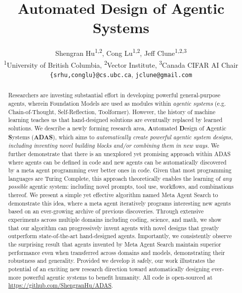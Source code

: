 \documentclass{article} %
\title{Automated Design of Agentic Systems}
\author{Shengran Hu\textsuperscript{1,2}, Cong Lu\textsuperscript{1,2}, Jeff Clune\textsuperscript{1,2,3} \vspace{0.1cm}\\
\textsuperscript{1}University of British Columbia,
\textsuperscript{2}Vector Institute,
\textsuperscript{3}Canada CIFAR AI Chair \vspace{0.1cm} \\
\texttt{\{srhu,conglu\}@cs.ubc.ca}, \texttt{jclune@gmail.com} \\
}
\newcommand{\problem}{ADAS\xspace}
\newcommand{\ouralgo}{Meta Agent Search\xspace}
\begin{document}
\maketitle

\begin{abstract}
Researchers are investing substantial effort in developing powerful general-purpose agents, wherein Foundation Models are used as modules within \emph{agentic systems} (e.g. Chain-of-Thought, Self-Reflection, Toolformer).
However, the history of machine learning teaches us that hand-designed solutions are eventually replaced by learned solutions.
We describe a newly forming research area, \textbf{A}utomated \textbf{D}esign of \textbf{A}gentic \textbf{S}ystems (\textbf{\problem}), which aims to \emph{automatically create powerful agentic system designs, including inventing novel building blocks and/or combining them in new ways.}
We further demonstrate that there is an unexplored yet promising approach within \problem where agents can be defined in code and new agents can be automatically discovered by a meta agent programming ever better ones in code.
Given that most programming languages are Turing Complete, this approach theoretically enables the learning of \emph{any possible} agentic system: including novel prompts, tool use, workflows, and combinations thereof.
We present a simple yet effective algorithm named \ouralgo to demonstrate this idea, where a meta agent iteratively programs interesting new agents based on an ever-growing archive of previous discoveries.
Through extensive experiments across multiple domains including coding, science, and math, we show that our algorithm can progressively invent agents with novel designs that greatly outperform state-of-the-art hand-designed agents.
Importantly, we consistently observe the surprising result that agents invented by \ouralgo maintain superior performance even when transferred across domains and models, demonstrating their robustness and generality. Provided we develop it safely, our work illustrates the potential of an exciting new research direction toward automatically designing ever-more powerful agentic systems to benefit humanity. All code is open-sourced at \href{https://github.com/ShengranHu/ADAS}{https://github.com/ShengranHu/ADAS}.
\end{abstract}



\end{document}
